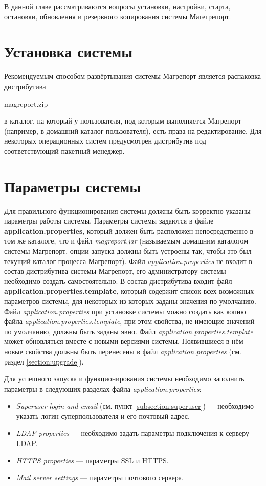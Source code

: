 \documentclass[../user-manual.tex]{subfiles}
\begin{document}
	
	В данной главе рассматриваются вопросы установки, настройки, старта, остановки, обновления и резервного копирования системы Магегрепорт.
	
	\section{Установка системы}

	Рекомендуемым способом развёртывания системы Магрепорт является распаковка дистрибутива 
	\begin{center}
		magreport.zip
	\end{center}
	в каталог, на который у пользователя, под которым выполняется Магрепорт (например, в домашний каталог пользователя), есть права на редактирование. Для некоторых операционных систем предусмотрен дистрибутив под соответствующий пакетный менеджер.
	
	\section{Параметры системы}
	
	Для правильного функционирования системы должны быть корректно указаны параметры работы системы. Параметры системы задаются в файле \textbf{application.properties}, который должен быть расположен непосредственно в том же каталоге, что и файл \textit{magreport.jar} (называемым домашним каталогом системы Магрепорт, опции запуска должны быть устроены так, чтобы это был текущий каталог процесса Магрепорт). Файл \textit{application.properties} не входит в состав дистрибутива системы Магрепорт, его администратору системы необходимо создать самостоятельно. В состав дистрибутива входит файл \textbf{application.properties.template}, который содержит список всех возможных параметров системы, для некоторых из которых заданы значения по умолчанию. Файл \textit{application.properties} при установке системы можно создать как копию файла \textit{application.properties.template}, при этом свойства, не имеющие значений по умолчанию, должны быть заданы явно. Файл \textit{application.properties.template} может обновляться вместе с новыми версиями системы. Появившиеся в нём новые свойства должны быть перенесены в файл \textit{application.properties} (см. раздел \ref{section:upgrade}).
	
	Для успешного запуска и функционирования системы необходимо заполнить параметры в следующих разделах файла \textit{application.properties}:
	
	\begin{itemize}
		\item \textit{Superuser login and email} (см. пункт \ref{subsection:superuser}) --- необходимо указать логин суперпользователя и его почтовый адрес.
		\item \textit{LDAP properties} --- необходимо задать параметры подключения к серверу LDAP.
		\item \textit{HTTPS properties} --- параметры SSL и HTTPS.
		\item \textit{Mail server settings} --- параметры почтового сервера.
	\end{itemize}
\end{document}
